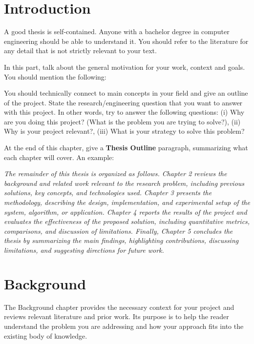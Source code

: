 \documentclass[12pt]{report}
\begin{document}



\chapter{Introduction}

A good thesis is self-contained. Anyone with a bachelor degree in computer engineering should be able to understand it. You should refer to the literature for any detail that is not strictly relevant to your text.

In this part, talk about the general motivation for your work, context and goals. You should mention the following:

You should technically connect to main concepts in your field and give an outline of the project. State the research/engineering question that you want to answer with this project. In other words, try to answer the following questions: (i) Why are you doing this project? (What is the problem you are trying to solve?), (ii) Why is your project relevant?, (iii) What is your strategy to solve this problem?

At the end of this chapter, give a \textbf{Thesis Outline} paragraph, summarizing what each chapter will cover. An example:

\textit{The remainder of this thesis is organized as follows. Chapter 2 reviews the background and related work relevant to the research problem, including previous solutions, key concepts, and technologies used. Chapter 3 presents the methodology, describing the design, implementation, and experimental setup of the system, algorithm, or application. Chapter 4 reports the results of the project and evaluates the effectiveness of the proposed solution, including quantitative metrics, comparisons, and discussion of limitations. Finally, Chapter 5 concludes the thesis by summarizing the main findings, highlighting contributions, discussing limitations, and suggesting directions for future work.}






\chapter{Background}

The Background chapter provides the necessary context for your project and reviews relevant literature and prior work. Its purpose is to help the reader understand the problem you are addressing and how your approach fits into the existing body of knowledge.
\end{document}
